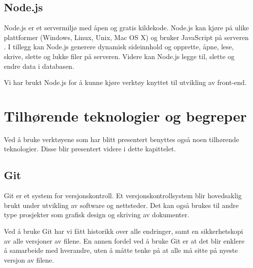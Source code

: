 
\subsection{Node.js}
Node.js er et servermiljø med åpen og gratis kildekode. Node.js kan kjøre på ulike plattformer (Windows, Linux, Unix, Mac OS X) og bruker JavaScript på serveren \cite{w3schools2019win}. I tillegg kan Node.js generere dynamisk sideinnhold og opprette, åpne, lese, skrive, slette og lukke filer på serveren. Videre kan Node.js legge til, slette og endre data i databasen.

Vi har brukt Node.js for å kunne kjøre verktøy knyttet til utvikling av front-end.

\section{Tilhørende teknologier og begreper}
Ved å bruke verktøyene som har blitt presentert benyttes også noen tilhørende teknologier. Disse blir presentert videre i dette kapittelet. 

\subsection{Git}
Git \cite{TechTarget} er et system for versjonskontroll. Et versjonskontrollsystem blir hovedsaklig brukt under utvikling av software og nettsteder. Det kan også brukes til andre type prosjekter som grafisk design og skriving av dokumenter.

Ved å bruke Git har vi fått historikk over alle endringer, samt en sikkerhetskopi av alle versjoner av filene. En annen fordel ved å bruke Git er at det blir enklere å samarbeide med hverandre, uten å måtte tenke på at alle må sitte på nyeste versjon av filene.



